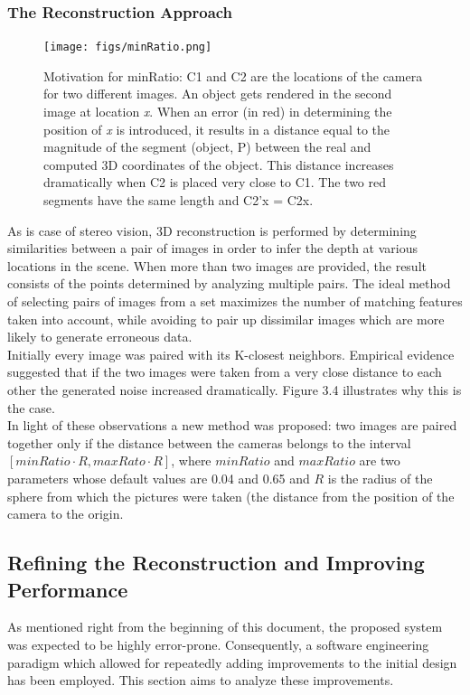 \documentclass[12pt,a4paper,twoside,openright]{report}
\begin{document}
\subsubsection{The Reconstruction Approach}
\begin{figure}
\begin{center}
\texttt{[image: figs/minRatio.png]} 
\caption{Motivation for minRatio: C1 and C2 are the locations of the camera for two different images. An object gets rendered in the second image at location \emph{x}. When an error (in red) in determining the position of \emph{x} is introduced, it results in a distance equal to the magnitude of the segment (object, P) between the real and computed 3D coordinates of the object. This distance increases dramatically when C2 is placed very close to C1. The two red segments have the same length and C2'x = C2x.}
\end{center}
\end{figure}
As is case of stereo vision, 3D reconstruction is performed by determining similarities between a pair of images in order to infer the depth at various locations in the scene. When more than two images are provided, the result consists of the points determined by analyzing multiple pairs. The ideal method of selecting pairs of images from a set maximizes the number of matching features taken into account, while avoiding to pair up dissimilar images which are more likely to generate erroneous data.\\
\linebreak
Initially every image was paired with its K-closest neighbors. Empirical evidence suggested that if the two images were taken from a very close distance to each other the generated noise increased dramatically. Figure 3.4 illustrates why this is the case. \\
In light of these observations a new method was proposed: two images are paired together only if the distance between the cameras belongs to the interval $[minRatio \cdot R, maxRato \cdot R]$, where $minRatio$ and $maxRatio$ are two parameters whose default values are 0.04 and 0.65 and $R$ is the radius of the sphere from which the pictures were taken (the distance from the position of the camera to the origin.

\subsection{Refining the Reconstruction and Improving Performance}
As mentioned right from the beginning of this document, the proposed system was expected to be highly error-prone. Consequently, a software engineering paradigm which allowed for repeatedly adding improvements to the initial design has been employed. This section aims to analyze these improvements.
\end{document}
